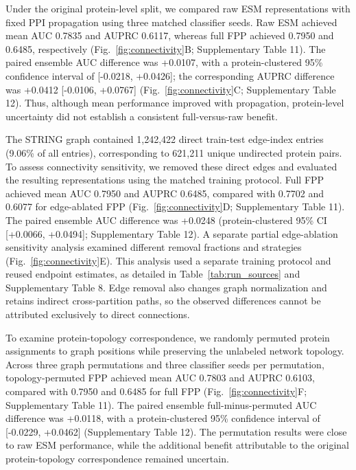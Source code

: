 \documentclass[conference]{IEEEtran}
\begin{document}
Under the original protein-level split, we compared raw ESM representations with fixed PPI propagation using three matched classifier seeds. Raw ESM achieved mean AUC 0.7835 and AUPRC 0.6117, whereas full FPP achieved 0.7950 and 0.6485, respectively (Fig.~\ref{fig:connectivity}B; Supplementary Table 11). The paired ensemble AUC difference was +0.0107, with a protein-clustered 95\% confidence interval of [-0.0218, +0.0426]; the corresponding AUPRC difference was +0.0412 [-0.0106, +0.0767] (Fig.~\ref{fig:connectivity}C; Supplementary Table 12). Thus, although mean performance improved with propagation, protein-level uncertainty did not establish a consistent full-versus-raw benefit.

The STRING graph contained 1,242,422 direct train-test edge-index entries (9.06\% of all entries), corresponding to 621,211 unique undirected protein pairs. To assess connectivity sensitivity, we removed these direct edges and evaluated the resulting representations using the matched training protocol. Full FPP achieved mean AUC 0.7950 and AUPRC 0.6485, compared with 0.7702 and 0.6077 for edge-ablated FPP (Fig.~\ref{fig:connectivity}D; Supplementary Table 11). The paired ensemble AUC difference was +0.0248 (protein-clustered 95\% CI [+0.0066, +0.0494]; Supplementary Table 12). A separate partial edge-ablation sensitivity analysis examined different removal fractions and strategies (Fig.~\ref{fig:connectivity}E). This analysis used a separate training protocol and reused endpoint estimates, as detailed in Table~\ref{tab:run_sources} and Supplementary Table 8. Edge removal also changes graph normalization and retains indirect cross-partition paths, so the observed differences cannot be attributed exclusively to direct connections.

To examine protein-topology correspondence, we randomly permuted protein assignments to graph positions while preserving the unlabeled network topology. Across three graph permutations and three classifier seeds per permutation, topology-permuted FPP achieved mean AUC 0.7803 and AUPRC 0.6103, compared with 0.7950 and 0.6485 for full FPP (Fig.~\ref{fig:connectivity}F; Supplementary Table 11). The paired ensemble full-minus-permuted AUC difference was +0.0118, with a protein-clustered 95\% confidence interval of [-0.0229, +0.0462] (Supplementary Table 12). The permutation results were close to raw ESM performance, while the additional benefit attributable to the original protein-topology correspondence remained uncertain.
\end{document}

